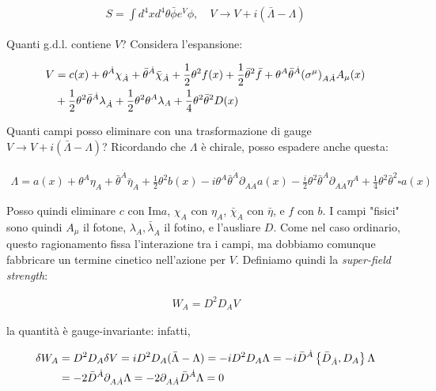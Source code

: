 \documentclass{report}
\begin{document}
\begin{align}
    S = \int d^4x d^4 \theta \bar{\phi}e^V \phi, \quad V \to V +i(\bar{\Lambda}-\Lambda)
\end{align}

Quanti g.d.l. contiene \(V\)? Considera l'espansione: 

\begin{align}
    V &= c(x) + \theta^{\dot{A}}\chi_{\dot{A}} + \bar{\theta}^{\dot{A}}\bar{\chi}_{\dot{A}} + \frac{1}{2}\theta^2 f(x) + \frac{1}{2}\bar{\theta}^2 \bar{f} + \theta^A \bar{\theta}^{\dot{A}}(\sigma^\mu)_{A\dot{A}}A_\mu (x) \notag \\
    &+\frac{1}{2}\theta^2 \bar{\theta}^{\dot{A}}\lambda_{\dot{A}} + \frac{1}{2}\theta^2 \theta^A \lambda_A + \frac{1}{4}\theta^2 \bar{\theta}^2 D(x)
\end{align}

Quanti campi posso eliminare con una trasformazione di gauge \(V \to V +i(\bar{\Lambda} - \Lambda)\)? Ricordando che \(\Lambda\) è chirale, posso espadere anche questa: 

\begin{align}
    \Lambda = a(x) + \theta^A \eta_A + \bar{\theta}^{\dot{A}}\bar{\eta}_{\dot{A}} + \frac{1}{2}\theta^2 b(x) -i\theta^A \bar{\theta}^{\dot{A}}\partial_{A\dot{A}}a(x) - \frac{i}{2}\theta^2 \bar{\theta}^{\dot{A}}\partial_{A\dot{A}}\eta^A + \frac{1}{4}\theta^2 \bar{\theta}^2 \square a(x)
\end{align}

Posso quindi eliminare \(c\) con Im\(a\), \(\chi_A\) con \(\eta_A\), \(\bar{\chi}_{\dot{A}}\) con \(\bar{\eta}\), e \(f\) con \(b\). I campi "fisici" sono quindi \(A_\mu\) il fotone, \(\lambda_A, \bar{\lambda}_{\dot{A}}\) il fotino, e l'ausliare \(D\). Come nel caso ordinario, questo ragionamento fissa l'interazione tra i campi, ma dobbiamo comunque fabbricare un termine cinetico nell'azione per \(V\). Definiamo quindi la \emph{super-field strength}: 

\begin{align}
    W_A = D^2 D_A V
\end{align}

la quantità è gauge-invariante: infatti, 

\begin{align}
    \delta W_A &= D^2 D_A \delta V = iD^2 D_A (\bar{\Lambda}-\Lambda) = -iD^2 D_A \Lambda = -i \bar{D}^{\dot{A}}\left\{ \bar{D}_{\dot{A}}, D_A \right\}\Lambda \notag \\ 
    &= -2\bar{D}^{\dot{A}}\partial_{A\dot{A}}\Lambda = -2\partial_{A\dot{A}}\bar{D}^{\dot{A}}\Lambda = 0   
\end{align}
\end{document}
